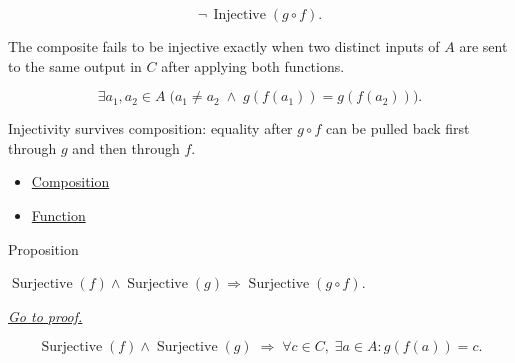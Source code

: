 \begin{remark*}
\[
  \neg\,\operatorname{Injective}(g\circ f).
\]
\end{remark*}

\begin{remark*}
The composite fails to be injective exactly when two distinct inputs of
$A$ are sent to the same output in $C$ after applying both functions.
\end{remark*}

\begin{remark*}
\[
  \exists a_1,a_2\in A\;\bigl(a_1\neq a_2\;\wedge\;g(f(a_1))=g(f(a_2))\bigr).
\]
\end{remark*}

\begin{remark*}[Interpretation]
Injectivity survives composition: equality after $g\circ f$ can be
pulled back first through $g$ and then through $f$.
\end{remark*}

\begin{dependencies}
\begin{itemize}
  \item \hyperref[def:composition]{Composition}
  \item \hyperref[def:function]{Function}
\end{itemize}
\end{dependencies}

\begin{propositionbox}{Proposition}
\begin{proposition}
\label{prop:composition-surjective}
$\operatorname{Surjective}(f)\wedge\operatorname{Surjective}(g)
\Rightarrow\operatorname{Surjective}(g\circ f)$.

\smallskip\noindent
\hyperref[prf:composition-surjective]{\textit{Go to proof.}}
\end{proposition}
\end{propositionbox}

\begin{remark*}
\[
  \operatorname{Surjective}(f)\wedge\operatorname{Surjective}(g)
  \;\Rightarrow\;
  \forall c\in C,\;\exists a\in A: g(f(a))=c.
\]
\end{remark*}

